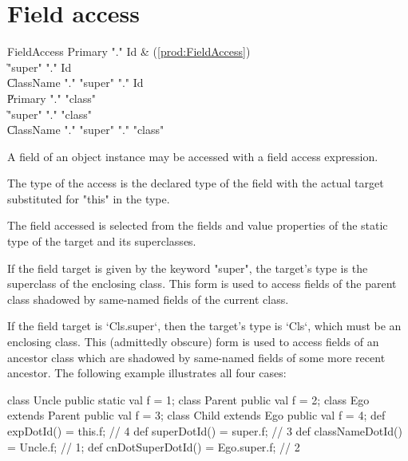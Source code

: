 \section{Field access}
\label{FieldAccess}

\begin{bbgrammar}
         FieldAccess \: Primary \xcd"." Id & (\ref{prod:FieldAccess}) \\
                    \| \xcd"super" \xcd"." Id \\
                    \| ClassName \xcd"." \xcd"super"  \xcd"." Id \\
                    \| Primary \xcd"." \xcd"class"  \\
                    \| \xcd"super" \xcd"." \xcd"class"  \\
                    \| ClassName \xcd"." \xcd"super"  \xcd"." \xcd"class"  \\
\end{bbgrammar}

A field of an object instance may be  accessed
with a field access expression.

The type of the access is the declared type of the field with the
actual target substituted for \xcd"this" in the type. 

The field accessed is selected from the fields and value properties
of the static type of the target and its superclasses.

If the field target is given by the keyword \xcd"super", the target's type is
the superclass of the enclosing class.  This form is used to access fields of
the parent class shadowed by same-named fields of the current class.

If the field target is \xcd`Cls.super`, then the target's type is \xcd`Cls`,
which must be an  enclosing class.  This (admittedly
obscure) form is used to access fields of an ancestor class which are shadowed
by same-named fields of some more recent ancestor.  The following example
illustrates all four cases:

\begin{xten}
class Uncle {
  public static val f = 1;
}
class Parent {
  public val f = 2;
}
class Ego extends Parent {
  public val f = 3;
  class Child extends Ego {
     public val f = 4;
     def expDotId() = this.f; // 4
     def superDotId() = super.f; // 3
     def classNameDotId() = Uncle.f; // 1;
     def cnDotSuperDotId() = Ego.super.f; // 2
  }
}
\end{xten}
%


